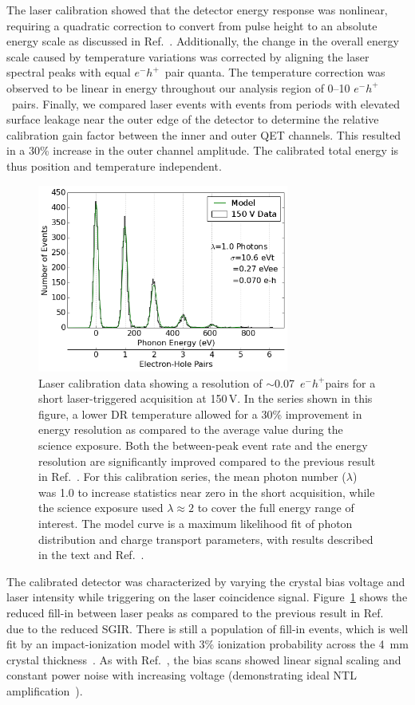 \documentclass[%
reprint,
superscriptaddress,
preprintnumbers,
amsmath,amssymb,
prl,
aps,
floatfix
]{revtex4-1}
\newcommand{\eh}{$e^-h^+$}
\begin{document}
The laser calibration showed that the detector energy response was nonlinear, requiring a quadratic correction to convert from pulse height to an absolute energy scale as discussed in Ref.~\cite{Romani}. Additionally, the change in the overall energy scale caused by temperature variations was corrected by aligning the laser spectral peaks with equal \eh\ pair quanta. The temperature correction was observed to be linear in energy throughout our analysis region of 0--10 \eh\ pairs. Finally, we compared laser events with events from periods with elevated surface leakage near the outer edge of the detector to determine the relative calibration gain factor between the inner and outer QET channels. This resulted in a 30\% increase in the outer channel amplitude. The calibrated total energy is thus position and temperature independent. 

\begin{figure}[t]
\centering
\includegraphics[clip=True,trim=6 6 0 0,width=3.25in]{150V_Model.png}
\caption{Laser calibration data showing a resolution of ${\sim}$0.07~\eh pairs for a short laser-triggered acquisition at 150\,V. In the series shown in this figure, a lower DR temperature allowed for a 30\% improvement in energy resolution as compared to the average value during the science exposure. Both the between-peak event rate and the energy resolution are significantly improved compared to the previous result in Ref.~\cite{Romani}. For this calibration series, the mean photon number ($\lambda$) was 1.0 to increase statistics near zero in the short acquisition, while the science exposure used $\lambda\approx2$ to cover the full energy range of interest. The model curve is a maximum likelihood fit of photon distribution and charge transport  parameters, with results described in the text and Ref.~\cite{Romani}.}
\label{fig:laser}
\end{figure}

The calibrated detector was characterized by varying the crystal bias voltage and laser intensity while triggering on the laser coincidence signal. Figure~\ref{fig:laser} shows the reduced fill-in between laser peaks as compared to the previous result in Ref.~\cite{Romani} due to the reduced SGIR. There is still a population of fill-in events, which is well fit by an impact-ionization model with 3\% ionization probability across the 4~mm crystal thickness~\cite{phipps}. As with Ref.~\cite{Romani}, the bias scans showed linear signal scaling and constant power noise with increasing voltage (demonstrating ideal NTL amplification~\cite{Irwin2005,Luke1988,Neganov1985}).
\end{document}
